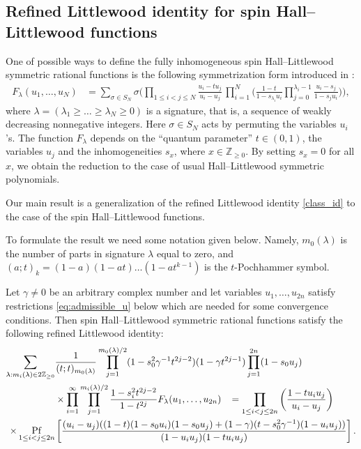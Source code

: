 \documentclass[ALCO,Unicode]{cedram}
\newcommand{\pf}{\mathop{\rm Pf}}
\begin{document}
\subsection{Refined Littlewood identity for spin Hall--Littlewood functions}

One of possible ways to define the fully inhomogeneous 
spin Hall--Littlewood 
symmetric rational functions is the following
symmetrization form introduced in \cite{BP18}:
\begin{equation*}
\begin{split}
F_\lambda(u_1,\ldots,u_N )
&=
\sum_{\sigma\in S_N}
\sigma
\Biggl( 
\prod_{1\le i<j\le N}\frac{u_i-t u_j}{u_i-u_j}\,
\prod_{i=1}^{N}
\biggl(
\frac{1-t}{1-s_{\lambda_i}u_i}
\prod_{j=0}^{\lambda_i-1}\frac{ u_i-s_j}{1- s_j u_i}
\biggr)
\Biggr),
\end{split}
\end{equation*}
where 
$\lambda=(\lambda_1\ge\ldots\ge \lambda_N\ge0 )$ is a signature, that is, a sequence of weakly decreasing nonnegative integers.
Here $\sigma\in S_N$
acts by permuting the variables $u_i$'s.
The function $F_\lambda$ depends on the ``quantum parameter''
$t \in (0, 1)$, the variables $u_j$ and the inhomogeneities $s_x$, where $x\in \mathbb{Z}_{\ge0}$.
By setting $s_x=0$ for all $x$, we obtain the reduction to the case of usual
Hall--Littlewood symmetric polynomials.

Our main result is a generalization of the refined Littlewood identity \eqref{class_id} to the case of the spin Hall--Littlewood functions. 

To formulate the result we need some notation given below. Namely, $m_0(\lambda)$ is the number of parts in signature $\lambda$ equal to zero, and 
$(a;t)_k=(1-a)(1-at)\ldots(1-at^{k-1})$ is the $t$-Pochhammer symbol.
\begin{theorem} \label{lit_id} 
	Let $\gamma\ne0$ be an arbitrary complex number and let variables $u_1, \dots, u_{2n}$ satisfy restrictions \eqref{eq:admissible_u} below which are needed for some convergence conditions.
	Then spin Hall--Littlewood symmetric rational functions satisfy the following refined Littlewood identity:
	\begin{equation} \label{littlewood_id}
	\begin{split}
	\sum_{\lambda: m_{i}(\lambda) \in 2 \mathbb{Z}_{\geq 0}} &\frac{1}{( t; t)_{m_{0}(\lambda)}} \prod_{j = 1}^{m_{0}(\lambda) / 2} (1 - s_{0}^2 \gamma^{-1} t^{2j - 2})(1 - \gamma t^{2j-1})  \prod_{j=1}^{2n} (1 - s_0 u_j)		\\&\times
	\prod_{i = 1}^{\infty} \prod_{j = 1}^{m_{i}(\lambda) / 2} \frac{1 - s_{i}^2 t^{2j - 2}}{1 - t^{2j}} F_{\lambda} (u_1, \dots, u_{2n})
	\; \;\;
	= 
	\prod_{1 \leq i<j \leq 2n}
	\left(
	\frac{1-t u_i u_j}{u_i - u_j}
	\right)
	\\\times
	\pf_{1\leq i < j \leq 2n}&
	\left[
	\frac{ (u_i - u_j)((1 - t)(1 - s_0 u_i)(1- s_0 u_j) + (1 - \gamma)(t-s_{0}^{2}\gamma^{-1})(1-u_i u_j))}
	{(1-u_i u_j) (1-t u_i u_j)}
	\right].
	\end{split}
	\end{equation}
\end{theorem}
\end{document}
